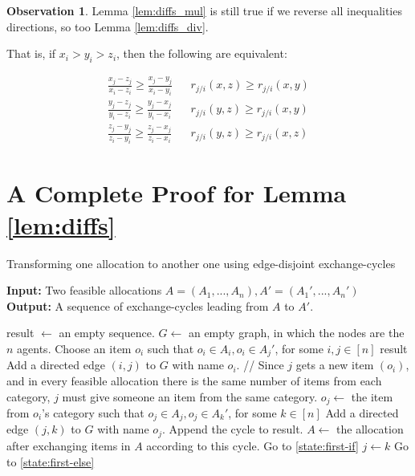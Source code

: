 \documentclass[sigconf]{aamas}
\theoremstyle{definition}
\newtheorem{observation}[theorem]{Observation}
\begin{document}
\begin{observation}
\label{obs}
Lemma \ref{lem:diffs_mul} is still true if we reverse all inequalities directions, so too Lemma \ref{lem:diffs_div}.

That is,
if $x_i > y_i > z_i$, 
then the following are equivalent:

\begin{align}
\frac{x_j-z_j}{x_i-z_i}  
\geq
\frac{x_j-y_j}{x_i-y_i}  
&& r_{j/i}(x,z) \geq r_{j/i}(x,y)
\\
\frac{y_j-z_j}{y_i-z_i}
\geq
\frac{y_j-x_j}{y_i-x_i}
&& r_{j/i}(y,z) \geq r_{j/i}(x,y)
\\
\frac{z_j-y_j}{z_i-y_i}
\geq
\frac{z_j-x_j}{z_i-x_i}
&& r_{j/i}(y,z) \geq r_{j/i}(x,z)
\end{align}
\end{observation}

\section{A Complete Proof for Lemma \ref{lem:diffs}}
\label{app:lem:diffs}

\begin{algorithm}[tb]
\caption{Transforming one allocation to another one using edge-disjoint exchange-cycles}
\label{alg:find-exchange-cycles}
\textbf{Input:} Two feasible allocations $A=(A_1,...,A_n), A'=(A_1',...,A_n')$ \\
\hspace*{\algorithmicindent} \textbf{Output:} A sequence of exchange-cycles leading from $A$ to $A'$.
\begin{algorithmic}[1]
\State \label{state:init}result $\gets$ an empty sequence.
\State \label{state:first-if}$G\gets$ an empty graph, in which the nodes are the $n$ agents.
\State Choose an item $o_i$ such that $o_i\in A_i, o_i\in A_j'$, for some $i,j\in [n]$
\State \Return result
\EndIf
\State Add a directed edge $(i,j)$ to $G$ with name $o_i$.
\Statex // Since $j$ gets a new item $(o_i)$, and in every feasible allocation there is the same number of items from each category, $j$ must give someone an item from the same category.
\State \label{state:first-else}$o_j\gets$ the item from $o_i$'s category such that $o_j\in A_j, o_j\in A_k'$, for some $k\in [n]$
\State Add a directed edge $(j,k)$ to $G$ with name $o_j$.
\State Append the cycle to result.
\State $A \gets$ the allocation after exchanging items in $A$ according to this cycle.
\State Go to \ref{state:first-if}
\Else
\State $j\gets k$
\State Go to \ref{state:first-else}
\EndIf
\end{algorithmic}
\end{algorithm}
\end{document}
